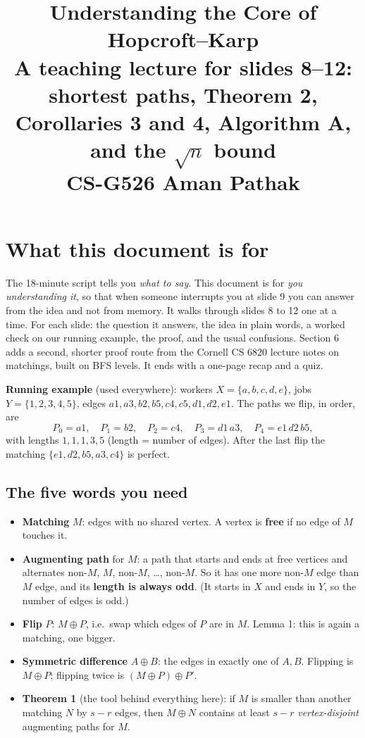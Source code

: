 \documentclass[11pt,a4paper]{article}
\title{\textbf{Understanding the Core of Hopcroft--Karp}\\[2pt]
\large A teaching lecture for slides 8--12: shortest paths, Theorem 2, Corollaries 3 and 4, Algorithm A, and the $\sqrt n$ bound\\[2pt]
\normalsize CS-G526 \quad Aman Pathak}
\author{}\date{}
\begin{document}
\maketitle

\section*{What this document is for}
The 18-minute script tells you \emph{what to say}. This document is for \emph{you understanding it}, so that when someone interrupts you at slide 9 you can answer from the idea and not from memory. It walks through slides 8 to 12 one at a time. For each slide: the question it answers, the idea in plain words, a worked check on our running example, the proof, and the usual confusions. Section 6 adds a second, shorter proof route from the Cornell CS 6820 lecture notes on matchings, built on BFS levels. It ends with a one-page recap and a quiz.

\textbf{Running example} (used everywhere): workers $X=\{a,b,c,d,e\}$, jobs $Y=\{1,2,3,4,5\}$, edges $a1,a3,b2,b5,c4,c5,d1,d2,e1$. The paths we flip, in order, are
\[
P_0=a1,\quad P_1=b2,\quad P_2=c4,\quad P_3=d1\,a3,\quad P_4=e1\,d2\,b5 ,
\]
with lengths $1,1,1,3,5$ (length = number of edges). After the last flip the matching $\{e1,d2,b5,a3,c4\}$ is perfect.

\subsection*{The five words you need}
\begin{itemize}
  \item \textbf{Matching} $M$: edges with no shared vertex. A vertex is \textbf{free} if no edge of $M$ touches it.
  \item \textbf{Augmenting path} for $M$: a path that starts and ends at free vertices and alternates non-$M$, $M$, non-$M$, \dots, non-$M$. So it has one more non-$M$ edge than $M$ edge, and its \textbf{length is always odd}. (It starts in $X$ and ends in $Y$, so the number of edges is odd.)
  \item \textbf{Flip} $P$: $M\oplus P$, i.e.\ swap which edges of $P$ are in $M$. Lemma 1: this is again a matching, one bigger.
  \item \textbf{Symmetric difference} $A\oplus B$: the edges in exactly one of $A,B$. Flipping is $M\oplus P$; flipping twice is $(M\oplus P)\oplus P'$.
  \item \textbf{Theorem 1} (the tool behind everything here): if $M$ is smaller than another matching $N$ by $s-r$ edges, then $M\oplus N$ contains at least $s-r$ \emph{vertex-disjoint} augmenting paths for $M$.
\end{itemize}
\end{document}
